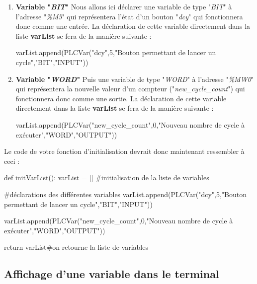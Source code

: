 \documentclass[12pt]{report}    %
\newcommand{\bold}[1]{{\bfseries #1}}
\newcommand{\italic}[1]{{\itshape #1}}
\begin{document}
\begin{enumerate}
\item \bold{Variable "\italic{BIT}"}\newline
Nous allons ici déclarer une variable de type "\italic{BIT}" à l'adresse "\italic{\%M5}" qui représentera l'état d'un bouton "\italic{dcy}" qui fonctionnera donc comme une entrée.\newline
La déclaration de cette variable directement dans la liste \bold{varList} se fera de la manière suivante :
\begin{pyCode}
varList.append(PLCVar("dcy",5,"Bouton permettant de lancer un cycle","BIT","INPUT"))
\end{pyCode}

\item \bold{Variable "\italic{WORD}"}\newline
Puis une variable de type "\italic{WORD}" à l'adresse "\italic{\%MW0}" qui représentera la nouvelle valeur d'un compteur ("\italic{new\_cycle\_count}") qui fonctionnera donc comme une sortie.\newline
La déclaration de cette variable directement dans la liste \bold{varList} se fera de la manière suivante :
\begin{pyCode}
varList.append(PLCVar("new_cycle_count",0,"Nouveau nombre de cycle à exécuter","WORD","OUTPUT"))
\end{pyCode}
\end{enumerate}

Le code de votre fonction d'initialisation devrait donc maintenant ressembler à ceci :
\begin{pyCode}
def initVarList():
	varList = [] #initialisation de la liste de variables

	#déclarations des différentes variables
	varList.append(PLCVar("dcy",5,"Bouton permettant de lancer un cycle","BIT","INPUT"))

	varList.append(PLCVar("new_cycle_count",0,"Nouveau nombre de cycle à exécuter","WORD","OUTPUT"))

	return varList#on retourne la liste de variables
\end{pyCode}





\subsection{Affichage d'une variable dans le terminal}
\end{document}
